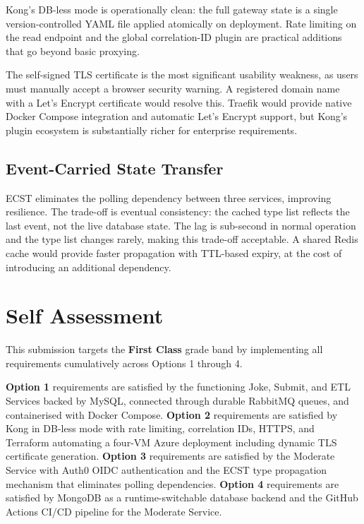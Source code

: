 \documentclass[12pt,a4paper]{article}
\begin{document}
Kong's DB-less mode is operationally clean: the full gateway state is a single version-controlled YAML file applied atomically on deployment. Rate limiting on the read endpoint and the global correlation-ID plugin are practical additions that go beyond basic proxying.

The self-signed TLS certificate is the most significant usability weakness, as users must manually accept a browser security warning. A registered domain name with a Let's Encrypt certificate would resolve this. Traefik would provide native Docker Compose integration and automatic Let's Encrypt support, but Kong's plugin ecosystem is substantially richer for enterprise requirements.

\subsection{Event-Carried State Transfer}

ECST eliminates the polling dependency between three services, improving resilience. The trade-off is eventual consistency: the cached type list reflects the last event, not the live database state. The lag is sub-second in normal operation and the type list changes rarely, making this trade-off acceptable. A shared Redis cache would provide faster propagation with TTL-based expiry, at the cost of introducing an additional dependency.

\section{Self Assessment}

This submission targets the \textbf{First Class} grade band by implementing all requirements cumulatively across Options 1 through 4.

\textbf{Option 1} requirements are satisfied by the functioning Joke, Submit, and ETL Services backed by MySQL, connected through durable RabbitMQ queues, and containerised with Docker Compose. \textbf{Option 2} requirements are satisfied by Kong in DB-less mode with rate limiting, correlation IDs, HTTPS, and Terraform automating a four-VM Azure deployment including dynamic TLS certificate generation. \textbf{Option 3} requirements are satisfied by the Moderate Service with Auth0 OIDC authentication and the ECST type propagation mechanism that eliminates polling dependencies. \textbf{Option 4} requirements are satisfied by MongoDB as a runtime-switchable database backend and the GitHub Actions CI/CD pipeline for the Moderate Service.
\end{document}
